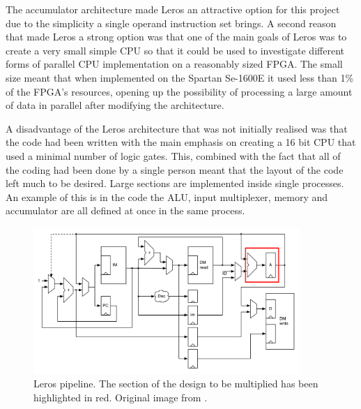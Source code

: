 The accumulator architecture made Leros an attractive option for this project due to 
the simplicity a single operand instruction set brings. A second reason that made Leros 
a strong option was that one of the main goals of Leros was to create a very small simple 
CPU so that it could be used to investigate different forms of parallel CPU implementation 
on a reasonably sized FPGA. The small size meant that when implemented on the Spartan 
Se-1600E it used less than 1\% of the FPGA's resources, opening up the possibility of
processing a large amount of data in parallel after modifying the architecture.

A disadvantage of the Leros architecture that was not initially realised was that the 
code had been written with the main emphasis on creating a 16 bit CPU that used a minimal 
number of logic gates. This, combined with the fact that all of the coding had been done 
by a single person meant that the layout of the code left much to be desired. Large sections 
are implemented inside single processes. An example of this is in the code the ALU, input 
multiplexer, memory and accumulator are all defined at once in the same process.
 
\begin{figure}[h]
\center
\includegraphics[width=0.9\textwidth]{images/leros-system}
\caption{Leros pipeline. The section of the design to be multiplied has been
highlighted in red. Original image from \cite{schoeberlleros}.
}
\label{fig:leros-system}
\end{figure}
